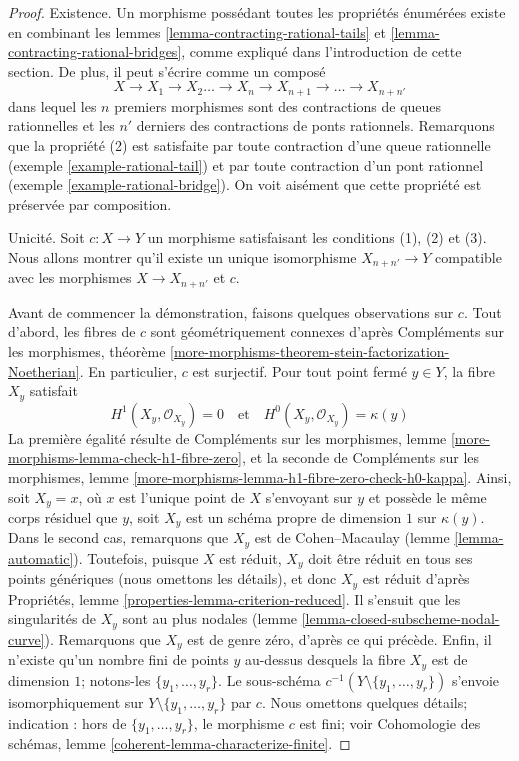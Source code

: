 \begin{proof}
Existence. Un morphisme possédant toutes les propriétés énumérées existe en combinant les lemmes \ref{lemma-contracting-rational-tails} et \ref{lemma-contracting-rational-bridges}, comme expliqué dans l'introduction de cette section. De plus, il peut s'écrire comme un composé $$
X \to X_1 \to X_2 \ldots \to X_n \to X_{n + 1} \to \ldots \to X_{n + n'}
$$ dans lequel les $n$ premiers morphismes sont des contractions de queues rationnelles et les $n'$ derniers des contractions de ponts rationnels. Remarquons que la propriété (2) est satisfaite par toute contraction d'une queue rationnelle (exemple \ref{example-rational-tail}) et par toute contraction d'un pont rationnel (exemple \ref{example-rational-bridge}). On voit aisément que cette propriété est préservée par composition.

\medskip\noindent
Unicité. Soit $c : X \to Y$ un morphisme satisfaisant les conditions (1), (2) et (3). Nous allons montrer qu'il existe un unique isomorphisme $X_{n + n'} \to Y$ compatible avec les morphismes $X \to X_{n + n'}$ et $c$.

\medskip\noindent
Avant de commencer la démonstration, faisons quelques observations sur $c$. Tout d'abord, les fibres de $c$ sont géométriquement connexes d'après Compléments sur les morphismes, théorème \ref{more-morphisms-theorem-stein-factorization-Noetherian}. En particulier, $c$ est surjectif. Pour tout point fermé $y \in Y$, la fibre $X_y$ satisfait $$
H^1(X_y, \mathcal{O}_{X_y}) = 0
\quad\text{et}\quad
H^0(X_y, \mathcal{O}_{X_y}) = \kappa(y)
$$ La première égalité résulte de Compléments sur les morphismes, lemme \ref{more-morphisms-lemma-check-h1-fibre-zero}, et la seconde de Compléments sur les morphismes, lemme \ref{more-morphisms-lemma-h1-fibre-zero-check-h0-kappa}. Ainsi, soit $X_y = x$, où $x$ est l'unique point de $X$ s'envoyant sur $y$ et possède le même corps résiduel que $y$, soit $X_y$ est un schéma propre de dimension $1$ sur $\kappa(y)$. Dans le second cas, remarquons que $X_y$ est de Cohen--Macaulay (lemme \ref{lemma-automatic}). Toutefois, puisque $X$ est réduit, $X_y$ doit être réduit en tous ses points génériques (nous omettons les détails), et donc $X_y$ est réduit d'après Propriétés, lemme \ref{properties-lemma-criterion-reduced}. Il s'ensuit que les singularités de $X_y$ sont au plus nodales (lemme \ref{lemma-closed-subscheme-nodal-curve}). Remarquons que $X_y$ est de genre zéro, d'après ce qui précède. Enfin, il n'existe qu'un nombre fini de points $y$ au-dessus desquels la fibre $X_y$ est de dimension $1$; notons-les $\{y_1, \ldots, y_r\}$. Le sous-schéma $c^{-1}(Y \setminus \{y_1, \ldots, y_r\})$ s'envoie isomorphiquement sur $Y \setminus \{y_1, \ldots, y_r\}$ par $c$. Nous omettons quelques détails; indication : hors de $\{y_1, \ldots, y_r\}$, le morphisme $c$ est fini; voir Cohomologie des schémas, lemme \ref{coherent-lemma-characterize-finite}.


\end{proof}
